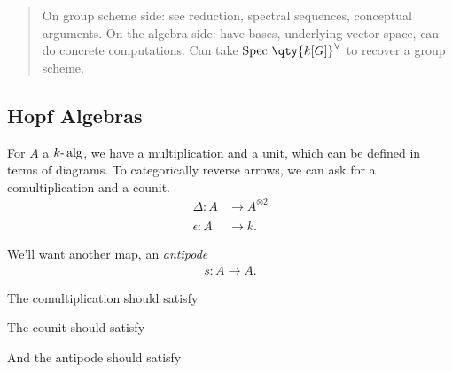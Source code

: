 \begin{quote}
On group scheme side: see reduction, spectral sequences, conceptual
arguments. On the algebra side: have bases, underlying vector space, can
do concrete computations. Can take
\(\operatorname{Spec}\,\qty{k[G]}^\vee\) to recover a group scheme.
\end{quote}

\hypertarget{hopf-algebras}{%
\subsection{Hopf Algebras}\label{hopf-algebras}}

For \(A\) a \(k{\hbox{-}}\operatorname{alg}\), we have a multiplication
and a unit, which can be defined in terms of diagrams. To categorically
reverse arrows, we can ask for a comultiplication and a counit.
\begin{align*}   \Delta: A &\to A^{\otimes 2} \\ \\ \epsilon: A &\to k  .\end{align*}

We'll want another map, an \emph{antipode}
\begin{align*}   s: A\to A .\end{align*}

The comultiplication should satisfy

\begin{center}
\end{center}

The counit should satisfy

\begin{center}
\end{center}

And the antipode should satisfy

\begin{center}
\end{center}

